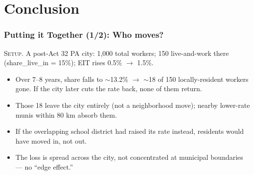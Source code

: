 \documentclass[xcolor = x11names, compress, aspectratio = 169]{beamer}
\renewcommand{\(}{\begin{columns}}
\renewcommand{\)}{\end{columns}}
\newcommand{\<}[1]{\begin{column}{#1}}
\renewcommand{\>}{\end{column}}
\begin{document}
%

\section{Conclusion}

\iffalse %
\begin{frame}
\frametitle{Putting it Together (1/2): Who moves?}
    \small
    \textsc{Setup.} A post-Act 32 PA city: 1{,}000 total workers;
    150 live-and-work there (share\_live\_in = 15\%); EIT rises
    0.5\% $\rightarrow$ 1.5\%.
    \vspace{0.2cm}
    \begin{itemize}\setlength{\itemsep}{0.15cm}
        \item[Q2/Q3.] Over 7--8 years, share falls to $\sim$13.2\% $\to$
        $\sim$18 of 150 locally-resident workers gone. If the city later
        cuts the rate back, none of them return.
        \item[Q4.] Those 18 leave the city entirely (not a neighborhood move);
        nearby lower-rate munis within 80 km absorb them.
        \item[Q5.] If the overlapping school district had raised its rate
        instead, residents would have moved in, not out.
        \item[Q6.] The loss is spread across the city, not concentrated
        at municipal boundaries --- no ``edge effect.''
    \end{itemize}
\end{frame}
\end{document}
